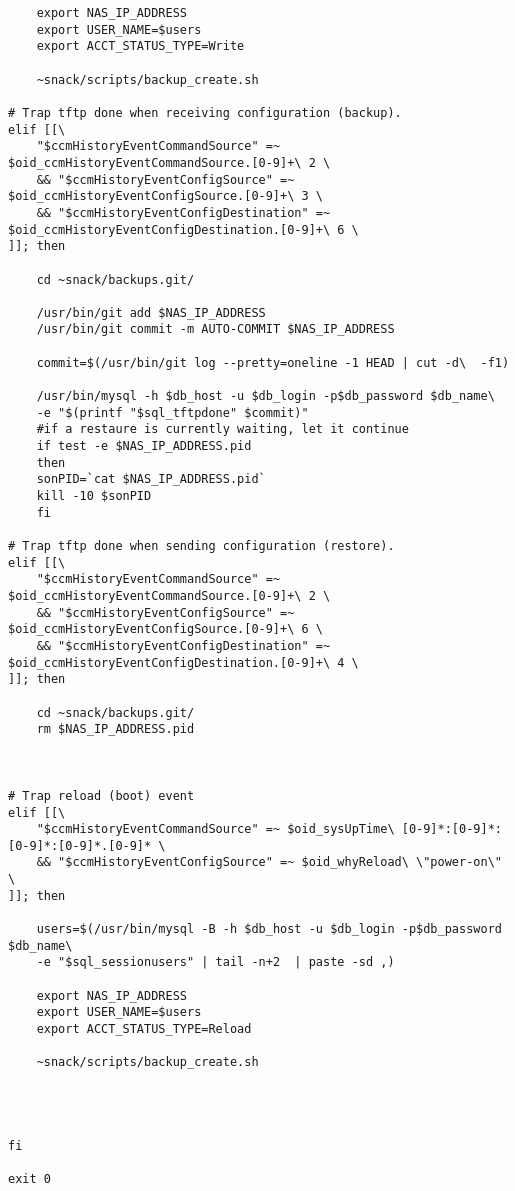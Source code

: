 \begin{lstlisting}
    export NAS_IP_ADDRESS
    export USER_NAME=$users
    export ACCT_STATUS_TYPE=Write

    ~snack/scripts/backup_create.sh

# Trap tftp done when receiving configuration (backup).
elif [[\
    "$ccmHistoryEventCommandSource" =~ $oid_ccmHistoryEventCommandSource.[0-9]+\ 2 \
    && "$ccmHistoryEventConfigSource" =~ $oid_ccmHistoryEventConfigSource.[0-9]+\ 3 \
    && "$ccmHistoryEventConfigDestination" =~ $oid_ccmHistoryEventConfigDestination.[0-9]+\ 6 \
]]; then

    cd ~snack/backups.git/

    /usr/bin/git add $NAS_IP_ADDRESS
    /usr/bin/git commit -m AUTO-COMMIT $NAS_IP_ADDRESS

    commit=$(/usr/bin/git log --pretty=oneline -1 HEAD | cut -d\  -f1)

    /usr/bin/mysql -h $db_host -u $db_login -p$db_password $db_name\
	-e "$(printf "$sql_tftpdone" $commit)"
    #if a restaure is currently waiting, let it continue
    if test -e $NAS_IP_ADDRESS.pid
    then
	sonPID=`cat $NAS_IP_ADDRESS.pid`
	kill -10 $sonPID
    fi

# Trap tftp done when sending configuration (restore).
elif [[\
    "$ccmHistoryEventCommandSource" =~ $oid_ccmHistoryEventCommandSource.[0-9]+\ 2 \
    && "$ccmHistoryEventConfigSource" =~ $oid_ccmHistoryEventConfigSource.[0-9]+\ 6 \
    && "$ccmHistoryEventConfigDestination" =~ $oid_ccmHistoryEventConfigDestination.[0-9]+\ 4 \
]]; then
    
    cd ~snack/backups.git/
    rm $NAS_IP_ADDRESS.pid



# Trap reload (boot) event
elif [[\
    "$ccmHistoryEventCommandSource" =~ $oid_sysUpTime\ [0-9]*:[0-9]*:[0-9]*:[0-9]*.[0-9]* \
    && "$ccmHistoryEventConfigSource" =~ $oid_whyReload\ \"power-on\" \
]]; then

    users=$(/usr/bin/mysql -B -h $db_host -u $db_login -p$db_password $db_name\
	-e "$sql_sessionusers" | tail -n+2  | paste -sd ,)

    export NAS_IP_ADDRESS
    export USER_NAME=$users
    export ACCT_STATUS_TYPE=Reload

    ~snack/scripts/backup_create.sh




fi

exit 0
\end{lstlisting}
\newpage
